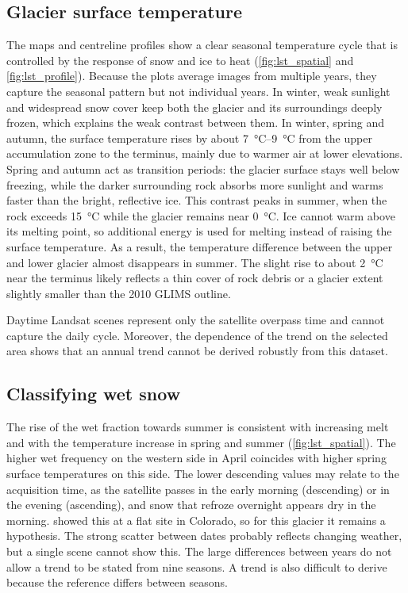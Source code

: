 \documentclass{article}
\begin{document}
\subsection{Glacier surface temperature}
The maps and centreline profiles show a clear seasonal temperature cycle that is controlled by the response of snow and ice to heat (\autoref{fig:lst_spatial} and \autoref{fig:lst_profile}). Because the plots average images from multiple years, they capture the seasonal pattern but not individual years. In winter, weak sunlight and widespread snow cover keep both the glacier and its surroundings deeply frozen, which explains the weak contrast between them. In winter, spring and autumn, the surface temperature rises by about \qtyrange{7}{9}{\degreeCelsius} from the upper accumulation zone to the terminus, mainly due to warmer air at lower elevations. %
Spring and autumn act as transition periods: the glacier surface stays well below freezing, while the darker surrounding rock absorbs more sunlight and warms faster than the bright, reflective ice. This contrast peaks in summer, when the rock exceeds \qty{15}{\degreeCelsius} while the glacier remains near \qty{0}{\degreeCelsius}. Ice cannot warm above its melting point, so additional energy is used for melting instead of raising the surface temperature. %
As a result, the temperature difference between the upper and lower glacier almost disappears in summer. The slight rise to about \qty{2}{\degreeCelsius} near the terminus likely reflects a thin cover of rock debris or a glacier extent slightly smaller than the 2010 GLIMS outline.

Daytime Landsat scenes represent only the satellite overpass time and cannot capture the daily cycle. Moreover, the dependence of the trend on the selected area shows that an annual trend cannot be derived robustly from this dataset.

\subsection{Classifying wet snow}
The rise of the wet fraction towards summer is consistent with increasing melt and with the temperature increase in spring and summer (\autoref{fig:lst_spatial}). The higher wet frequency on the western side in April coincides with higher spring surface temperatures on this side. The lower descending values may relate to the acquisition time, as the satellite passes in the early morning (descending) or in the evening (ascending), and snow that refroze overnight appears dry in the morning. \cite{lund_interpreting_2022} showed this at a flat site in Colorado, so for this glacier it remains a hypothesis. The strong scatter between dates probably reflects changing weather, but a single scene cannot show this. The large differences between years do not allow a trend to be stated from nine seasons. A trend is also difficult to derive because the reference differs between seasons.
\end{document}
